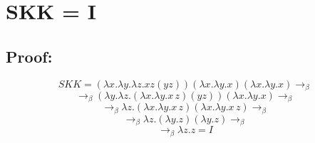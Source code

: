 \documentclass[12pt]{article}
\begin{document}
\section*{SKK = I}
\subsection*{Proof:}

\[  SKK = ({\lambda} x.{\lambda} y.{\lambda} z.xz(yz))({\lambda} x.{\lambda} y.x)({\lambda} x.{\lambda} y.x)    \rightarrow_{\beta} \]
\[  \rightarrow_{\beta} ({\lambda} y.{\lambda} z.({\lambda} x.{\lambda} y.x \, z)(yz))({\lambda} x.{\lambda} y.x) \rightarrow_{\beta} \]
\[  \rightarrow_{\beta} {\lambda} z.({\lambda} x.{\lambda} y.x \, z)({\lambda} x.{\lambda} y.x \, z) \rightarrow_{\beta} \]
\[  \rightarrow_{\beta} {\lambda} z.({\lambda} y.z)({\lambda} y.z) \rightarrow_{\beta} \]
\[  \rightarrow_{\beta} {\lambda} z.z = I   \]
\end{document}

